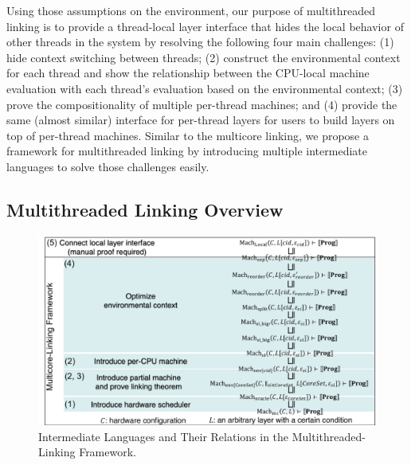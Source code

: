 Using those assumptions on the environment,
our purpose of  multithreaded linking is to provide a thread-local layer interface that hides 
the local behavior of other threads in the system by resolving the following four 
main challenges:
(1) hide context switching between threads; 
(2) construct the environmental context for each thread and show the relationship between the CPU-local machine evaluation with each thread's evaluation based on the environmental context;
(3) prove the compositionality of multiple per-thread machines; and 
(4) provide the same (almost similar) interface for per-thread layers 
for users to build layers on top of per-thread machines. 
Similar to the multicore linking, 
we propose a framework for multithreaded linking by introducing multiple intermediate languages to 
solve those challenges easily.



\subsection{Multithreaded Linking Overview}
\label{chapter:linking:subsec:multithreaded-linking-overview}



\begin{figure}
\begin{center}
\includegraphics[width=\textwidth, page=2]{figs/conlink/concurrent_linking}
\caption{Intermediate Languages and Their Relations in the Multithreaded-Linking Framework.}
\label{fig:chapter:linking:multithreaded-linking-structure}
\end{center}
\end{figure}


